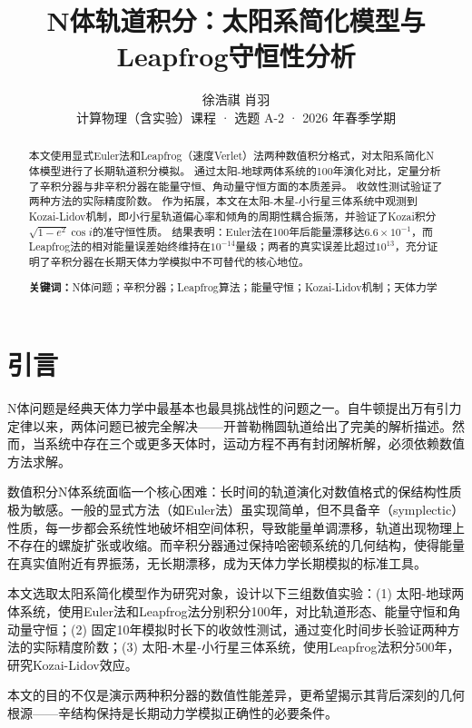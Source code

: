 \documentclass[twocolumn,10pt]{article}
\title{\vspace{-1.5cm}\textbf{N体轨道积分：太阳系简化模型与\\Leapfrog守恒性分析}\vspace{-0.3cm}}
\author{%
    \small
    徐浩祺%
    \quad
    肖羽 \\[3pt]
    \small 计算物理（含实验）课程 · 选题 A-2 · 2026 年春季学期
}
\date{}
\begin{document}
\maketitle

\begin{abstract}
    本文使用显式Euler法和Leapfrog（速度Verlet）法两种数值积分格式，对太阳系简化N体模型进行了长期轨道积分模拟。
    通过太阳-地球两体系统的100年演化对比，定量分析了辛积分器与非辛积分器在能量守恒、角动量守恒方面的本质差异。
    收敛性测试验证了两种方法的实际精度阶数。
    作为拓展，本文在太阳-木星-小行星三体系统中观测到Kozai-Lidov机制，即小行星轨道偏心率和倾角的周期性耦合振荡，并验证了Kozai积分$\sqrt{1-e^2}\cos i$的准守恒性质。
    结果表明：Euler法在100年后能量漂移达$6.6\times 10^{-1}$，而Leapfrog法的相对能量误差始终维持在$10^{-14}$量级；两者的真实误差比超过$10^{13}$，充分证明了辛积分器在长期天体力学模拟中不可替代的核心地位。

    \textbf{关键词：}N体问题；辛积分器；Leapfrog算法；能量守恒；Kozai-Lidov机制；天体力学
\end{abstract}

\section{引言}

N体问题是经典天体力学中最基本也最具挑战性的问题之一。自牛顿提出万有引力定律以来，两体问题已被完全解决——开普勒椭圆轨道给出了完美的解析描述。然而，当系统中存在三个或更多天体时，运动方程不再有封闭解析解，必须依赖数值方法求解\cite{murray1999solar, zingale2024astro}。

数值积分N体系统面临一个核心困难：长时间的轨道演化对数值格式的保结构性质极为敏感。一般的显式方法（如Euler法）虽实现简单，但不具备辛（symplectic）性质，每一步都会系统性地破坏相空间体积，导致能量单调漂移，轨道出现物理上不存在的螺旋扩张或收缩\cite{hairer2006geometric}。而辛积分器通过保持哈密顿系统的几何结构，使得能量在真实值附近有界振荡，无长期漂移，成为天体力学长期模拟的标准工具\cite{yoshida1990construction}。

本文选取太阳系简化模型作为研究对象，设计以下三组数值实验：(1) 太阳-地球两体系统，使用Euler法和Leapfrog法分别积分100年，对比轨道形态、能量守恒和角动量守恒；(2) 固定10年模拟时长下的收敛性测试，通过变化时间步长验证两种方法的实际精度阶数；(3) 太阳-木星-小行星三体系统，使用Leapfrog法积分500年，研究Kozai-Lidov效应。

本文的目的不仅是演示两种积分器的数值性能差异，更希望揭示其背后深刻的几何根源——辛结构保持是长期动力学模拟正确性的必要条件。
\end{document}
